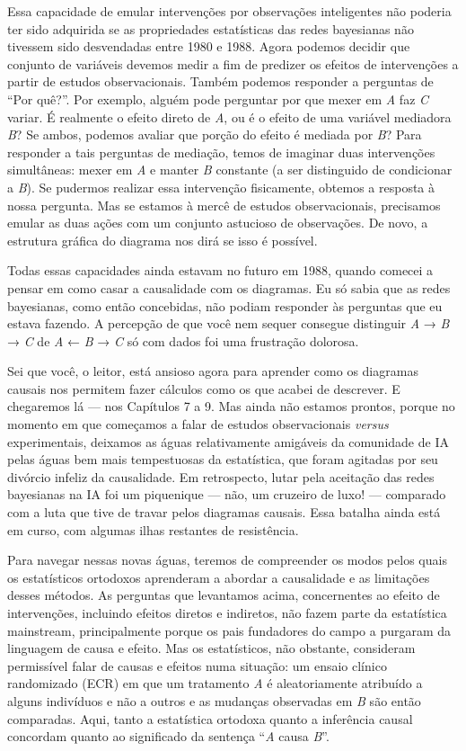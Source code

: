 \documentclass[11pt,a5paper,twoside]{book}
\begin{document}
Essa capacidade de emular intervenções por observações inteligentes não poderia ter sido adquirida se as propriedades estatísticas das redes bayesianas não tivessem sido desvendadas entre 1980 e 1988. Agora podemos decidir que conjunto de variáveis devemos medir a fim de predizer os efeitos de intervenções a partir de estudos observacionais. Também podemos responder a perguntas de “Por quê?”. Por exemplo, alguém pode perguntar por que mexer em \textit{A} faz \textit{C} variar. É realmente o efeito direto de \textit{A}, ou é o efeito de uma variável mediadora \textit{B}? Se ambos, podemos avaliar que porção do efeito é mediada por \textit{B}? Para responder a tais perguntas de mediação, temos de imaginar duas intervenções simultâneas: mexer em \textit{A} e manter \textit{B} constante (a ser distinguido de condicionar a \textit{B}). Se pudermos realizar essa intervenção fisicamente, obtemos a resposta à nossa pergunta. Mas se estamos à mercê de estudos observacionais, precisamos emular as duas ações com um conjunto astucioso de observações. De novo, a estrutura gráfica do diagrama nos dirá se isso é possível.

Todas essas capacidades ainda estavam no futuro em 1988, quando comecei a pensar em como casar a causalidade com os diagramas. Eu só sabia que as redes bayesianas, como então concebidas, não podiam responder às perguntas que eu estava fazendo. A percepção de que você nem sequer consegue distinguir \textit{A} → \textit{B} → \textit{C} de \textit{A} ← \textit{B} → \textit{C} só com dados foi uma frustração dolorosa.

Sei que você, o leitor, está ansioso agora para aprender como os diagramas causais nos permitem fazer cálculos como os que acabei de descrever. E chegaremos lá — nos Capítulos 7 a 9. Mas ainda não estamos prontos, porque no momento em que começamos a falar de estudos observacionais \textit{versus} experimentais, deixamos as águas relativamente amigáveis da comunidade de IA pelas águas bem mais tempestuosas da estatística, que foram agitadas por seu divórcio infeliz da causalidade. Em retrospecto, lutar pela aceitação das redes bayesianas na IA foi um piquenique — não, um cruzeiro de luxo! — comparado com a luta que tive de travar pelos diagramas causais. Essa batalha ainda está em curso, com algumas ilhas restantes de resistência.

Para navegar nessas novas águas, teremos de compreender os modos pelos quais os estatísticos ortodoxos aprenderam a abordar a causalidade e as limitações desses métodos. As perguntas que levantamos acima, concernentes ao efeito de intervenções, incluindo efeitos diretos e indiretos, não fazem parte da estatística mainstream, principalmente porque os pais fundadores do campo a purgaram da linguagem de causa e efeito. Mas os estatísticos, não obstante, consideram permissível falar de causas e efeitos numa situação: um ensaio clínico randomizado (ECR) em que um tratamento \textit{A} é aleatoriamente atribuído a alguns indivíduos e não a outros e as mudanças observadas em \textit{B} são então comparadas. Aqui, tanto a estatística ortodoxa quanto a inferência causal concordam quanto ao significado da sentença “\textit{A} causa \textit{B}”.
\end{document}
